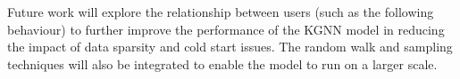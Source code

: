 \documentclass[11pt,twoside]{report}
\begin{document}
Future work will explore the relationship between users (such as the following behaviour) to further improve the performance of the KGNN model in reducing the impact of data sparsity and cold start issues. The random walk and sampling techniques will also be integrated to enable the model to run on a larger scale.




\end{document}
